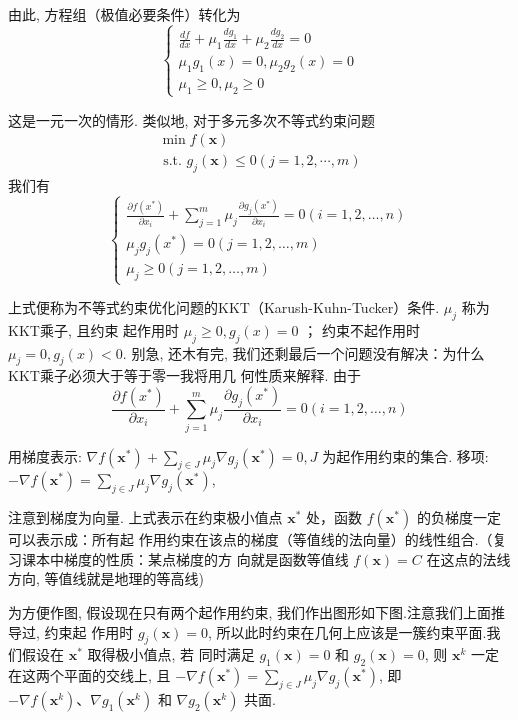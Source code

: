 由此, 方程组（极值必要条件）转化为
$$
\left\{\begin{array}{l}
\frac{d f}{d x}+\mu_{1} \frac{d g_{1}}{d x}+\mu_{2} \frac{d g_{2}}{d x}=0 \\
\mu_{1} g_{1}(x)=0, \mu_{2} g_{2}(x)=0 \\
\mu_{1} \geq 0, \mu_{2} \geq 0
\end{array}\right.
$$

这是一元一次的情形. 类似地, 对于多元多次不等式约束问题
$$
\begin{array}{l}
\min f(\mathbf{x}) \\
\text { s.t. } g_{j}(\mathbf{x}) \leq 0(j=1,2, \cdots, m)
\end{array}
$$
我们有
$$
\left\{\begin{array}{l}
\frac{\partial f\left(x^{*}\right)}{\partial x_{i}}+\sum_{j=1}^{m} \mu_{j} \frac{\partial g_{j}\left(x^{*}\right)}{\partial x_{i}}=0(i=1,2, \ldots, n) \\
\mu_{j} g_{j}\left(x^{*}\right)=0(j=1,2, \ldots, m) \\
\mu_{j} \geq 0(j=1,2, \ldots, m)
\end{array}\right.
$$

上式便称为不等式约束优化问题的KKT（Karush-Kuhn-Tucker）条件. $ \mu_{j} $ 称为KKT乘子, 且约束 起作用时 $ \mu_{j} \geq 0, g_{j}(x)=0 $ ； 约束不起作用时 $ \mu_{j}=0, g_{j}(x)<0 $.
别急, 还木有完, 我们还剩最后一个问题没有解决：为什么KKT乘子必须大于等于零一我将用几 何性质来解释.
由于
$$
\frac{\partial f\left(x^{*}\right)}{\partial x_{i}}+\sum_{j=1}^{m} \mu_{j} \frac{\partial g_{j}\left(x^{*}\right)}{\partial x_{i}}=0(i=1,2, \ldots, n)
$$

用梯度表示: $ \nabla f\left(\mathbf{x}^{*}\right)+\sum_{j \in J} \mu_{j} \nabla g_{j}\left(\mathbf{x}^{*}\right)=0, J $ 为起作用约束的集合.
移项: $ -\nabla f\left(\mathbf{x}^{*}\right)=\sum_{j \in J} \mu_{j} \nabla g_{j}\left(\mathbf{x}^{*}\right) $,

注意到梯度为向量. 上式表示在约束极小值点 $ \mathbf{x}^{*} $ 处，函数 $ f\left(\mathbf{x}^{*}\right) $ 的负梯度一定可以表示成：所有起 作用约束在该点的梯度（等值线的法向量）的线性组合.（复习课本中梯度的性质：某点梯度的方 向就是函数等值线 $ f(\mathbf{x})=C $ 在这点的法线方向, 等值线就是地理的等高线)

为方便作图, 假设现在只有两个起作用约束, 我们作出图形如下图.注意我们上面推导过, 约束起 作用时 $ g_{j}(\mathbf{x})=0 $, 所以此时约束在几何上应该是一簇约束平面.我们假设在 $ \mathbf{x}^{*} $ 取得极小值点, 若 同时满足 $ g_{1}(\mathbf{x})=0 $ 和 $ g_{2}(\mathbf{x})=0 $, 则 $ \mathbf{x}^{k} $ 一定在这两个平面的交线上, 且 $ -\nabla f\left(\mathbf{x}^{*}\right)=\sum_{j \in J} \mu_{j} \nabla g_{j}\left(\mathbf{x}^{*}\right) $, 即 $ -\nabla f\left(\mathbf{x}^{k}\right) 、 \nabla g_{1}\left(\mathbf{x}^{k}\right) $ 和 $ \nabla g_{2}\left(\mathbf{x}^{k}\right) $ 共面.

